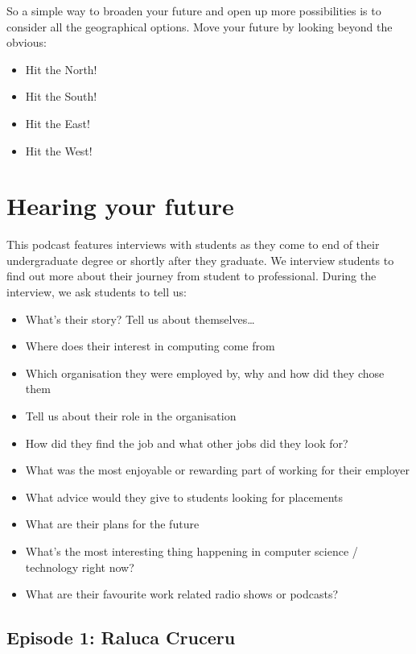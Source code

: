 \documentclass[
]{book}
\providecommand{\tightlist}{%
  \setlength{\itemsep}{0pt}\setlength{\parskip}{0pt}}
\begin{document}
So a simple way to broaden your future and open up more possibilities is to consider all the geographical options. Move your future by looking beyond the obvious:

\begin{itemize}
\tightlist
\item
  Hit the North!
\item
  Hit the South!
\item
  Hit the East!
\item
  Hit the West!
\end{itemize}

\hypertarget{hearing}{%
\chapter{Hearing your future}\label{hearing}}

This podcast features interviews with students as they come to end of their undergraduate degree or shortly after they graduate. We interview students to find out more about their journey from student to professional. During the interview, we ask students to tell us:

\begin{itemize}
\tightlist
\item
  What's their story? Tell us about themselves\ldots{}
\item
  Where does their interest in computing come from
\item
  Which organisation they were employed by, why and how did they chose them
\item
  Tell us about their role in the organisation
\item
  How did they find the job and what other jobs did they look for?
\item
  What was the most enjoyable or rewarding part of working for their employer
\item
  What advice would they give to students looking for placements
\item
  What are their plans for the future
\item
  What's the most interesting thing happening in computer science / technology right now?
\item
  What are their favourite work related radio shows or podcasts?
\end{itemize}

\hypertarget{episode-1-raluca-cruceru}{%
\section{Episode 1: Raluca Cruceru}\label{episode-1-raluca-cruceru}}
\end{document}
